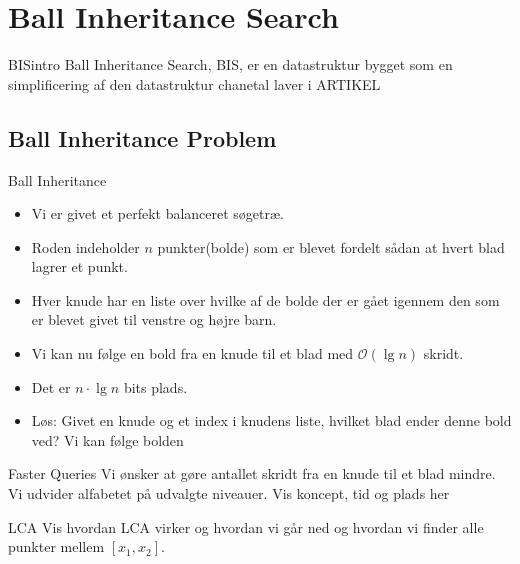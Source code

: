 \documentclass[pdf]{beamer}
\begin{document}

\section{Ball Inheritance Search}
\begin{frame}{BISintro}
  Ball Inheritance Search, BIS, er en datastruktur bygget som en simplificering af den datastruktur chanetal laver i ARTIKEL

\end{frame}


\subsection{Ball Inheritance Problem}

\begin{frame}{Ball Inheritance}

  \begin{itemize}
    \item Vi er givet et perfekt balanceret søgetræ.
      \pause
    \item Roden indeholder $n$ punkter(bolde) som er blevet fordelt sådan at hvert blad lagrer et punkt.
      \pause
    \item Hver knude har en liste over hvilke af de bolde der er gået igennem den som er blevet givet til venstre og højre barn.
      \pause
    \item Vi kan nu følge en bold fra en knude til et blad med $\mathcal{O}(\lg n)$ skridt.
      \pause
    \item Det er $n \cdot \lg n$ bits plads.
      \pause
    \item Løs: Givet en knude og et index i knudens liste, hvilket blad ender denne bold ved? Vi kan følge bolden 
  \end{itemize}
\end{frame}

\begin{frame}{Faster Queries}
  Vi ønsker at gøre antallet skridt fra en knude til et blad mindre. Vi udvider alfabetet på udvalgte niveauer.
  Vis koncept, tid og plads her
\end{frame}

\begin{frame}{LCA}
  Vis hvordan LCA virker og hvordan vi går ned og hvordan vi finder alle punkter mellem $[x_1, x_2]$.
\end{frame}
\end{document}
